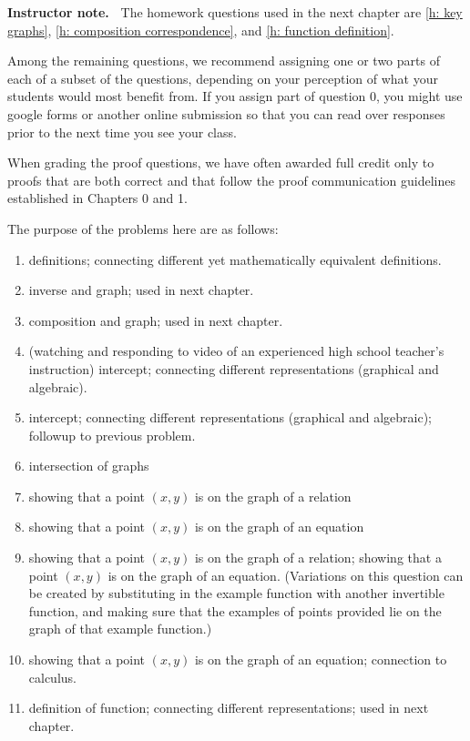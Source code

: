 \documentclass[11pt]{article}
\newenvironment{bignote}[1][Instructor note]%
	{\begin{mdframed}\raggedright{\bf #1.~}}
	{\end{mdframed}}
\theoremstyle{definition}
\begin{document}
\begin{bignote}
The homework questions used in the next chapter are \ref{h: key graphs}, \ref{h: composition correspondence}, and \ref{h: function definition}. 

Among the remaining questions, we recommend assigning one or two parts of each of a subset of the questions, depending on your perception of what your students would most benefit from. If you assign part of question 0, you might use google forms or another online submission so that you can read over responses prior to the next time you see your class. 

When grading the proof questions, we have often awarded full credit only to proofs that are both correct and that follow the proof communication guidelines established in Chapters 0 and 1. 

The purpose of the problems here are as follows:
	\begin{enumerate}
	\item definitions;  connecting different yet mathematically equivalent definitions.
	\item inverse and graph; used in next chapter.
	\item composition and graph; used in next chapter.
	\item (watching and responding to video of an experienced high school teacher's instruction) intercept; connecting different representations (graphical and algebraic).
	\item intercept; connecting different representations (graphical and algebraic); followup to previous problem.
	\item intersection of graphs
	\item showing that a point $(x,y)$ is on the graph of a relation
	\item showing that a point $(x,y)$ is on the graph of an equation
	\item showing that a point $(x,y)$ is on the graph of a relation; showing that a point $(x,y)$ is on the graph of an equation. (Variations on this question can be created by substituting in the example function with another invertible function, and making sure that the examples of points provided lie on the graph of that example function.)
	\item showing that a point $(x,y)$ is on the graph of an equation; connection to calculus. 
	\item definition of function; connecting different representations; used in next chapter.
	\end{enumerate}
\end{bignote}
\end{document}
